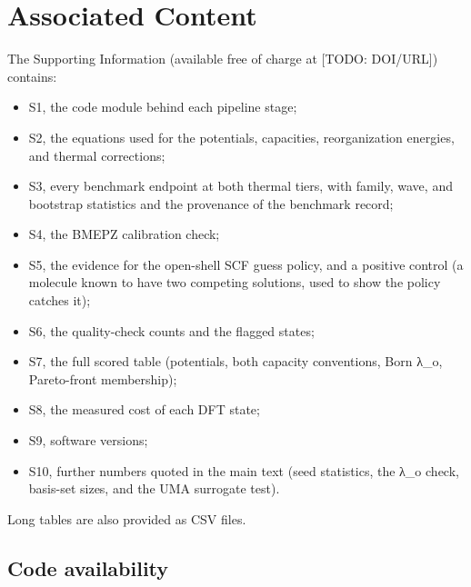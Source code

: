 \documentclass[journal=jcisd8,manuscript=article]{achemso}
\begin{document}
\section*{Associated Content}

\begin{suppinfo}

The Supporting Information (available free of charge at [TODO: DOI/URL]) contains:
\begin{itemize}
\item S1, the code module behind each pipeline stage;
\item S2, the equations used for the potentials, capacities, reorganization energies, and thermal corrections;
\item S3, every benchmark endpoint at both thermal tiers, with family, wave, and bootstrap statistics and the provenance of the benchmark record;
\item S4, the BMEPZ calibration check;
\item S5, the evidence for the open-shell SCF guess policy, and a positive control (a molecule known to have two competing solutions, used to show the policy catches it);
\item S6, the quality-check counts and the flagged states;
\item S7, the full scored table (potentials, both capacity conventions, Born λ\_o, Pareto-front membership);
\item S8, the measured cost of each DFT state;
\item S9, software versions;
\item S10, further numbers quoted in the main text (seed statistics, the λ\_o check, basis-set sizes, and the UMA surrogate test).
\end{itemize}
Long tables are also provided as CSV files.
\end{suppinfo}

\subsection*{Code availability}
\end{document}

